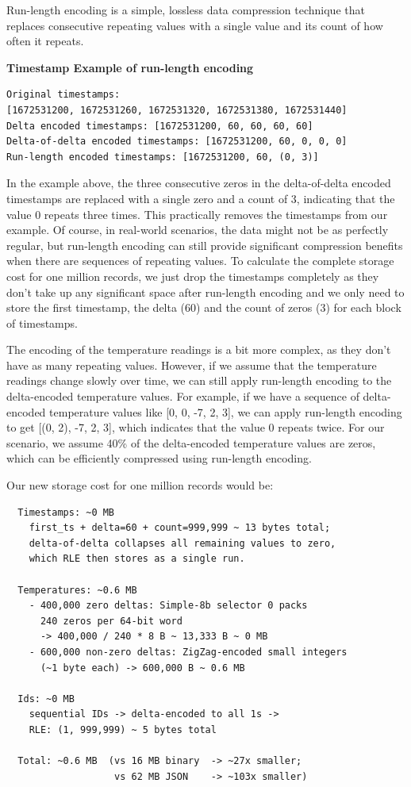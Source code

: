 Run-length encoding is a simple, lossless data compression technique that
replaces consecutive repeating values with a single value and its count of how
often it repeats.

\textbf{Timestamp Example of run-length encoding}
\begin{verbatim}
Original timestamps:
[1672531200, 1672531260, 1672531320, 1672531380, 1672531440]
Delta encoded timestamps: [1672531200, 60, 60, 60, 60]
Delta-of-delta encoded timestamps: [1672531200, 60, 0, 0, 0]
Run-length encoded timestamps: [1672531200, 60, (0, 3)]
\end{verbatim}

In the example above, the three consecutive zeros in the delta-of-delta encoded
timestamps are replaced with a single zero and a count of 3, indicating that
the value 0 repeats three times. This practically removes the timestamps from
our example. Of course, in real-world scenarios, the data might not be as
perfectly regular, but run-length encoding can still provide significant
compression benefits when there are sequences of repeating values. To calculate
the complete storage cost for one million records, we just drop the timestamps
completely as they don't take up any significant space after run-length
encoding and we only need to store the first timestamp, the delta (60) and the
count of zeros (3) for each block of timestamps.

The encoding of the temperature readings is a bit more complex, as they don't
have as many repeating values. However, if we assume that the temperature
readings change slowly over time, we can still apply run-length encoding to the
delta-encoded temperature values. For example, if we have a sequence of
delta-encoded temperature values like [0, 0, -7, 2, 3], we can apply run-length
encoding to get [(0, 2), -7, 2, 3], which indicates that the value 0 repeats
twice. For our scenario, we assume 40\% of the delta-encoded temperature values
are zeros, which can be efficiently compressed using run-length encoding.

Our new storage cost for one million records would be:
\begin{verbatim}
  Timestamps: ~0 MB
    first_ts + delta=60 + count=999,999 ~ 13 bytes total;
    delta-of-delta collapses all remaining values to zero,
    which RLE then stores as a single run.

  Temperatures: ~0.6 MB
    - 400,000 zero deltas: Simple-8b selector 0 packs
      240 zeros per 64-bit word
      -> 400,000 / 240 * 8 B ~ 13,333 B ~ 0 MB
    - 600,000 non-zero deltas: ZigZag-encoded small integers
      (~1 byte each) -> 600,000 B ~ 0.6 MB

  Ids: ~0 MB
    sequential IDs -> delta-encoded to all 1s ->
    RLE: (1, 999,999) ~ 5 bytes total

  Total: ~0.6 MB  (vs 16 MB binary  -> ~27x smaller;
                   vs 62 MB JSON    -> ~103x smaller)
\end{verbatim}

